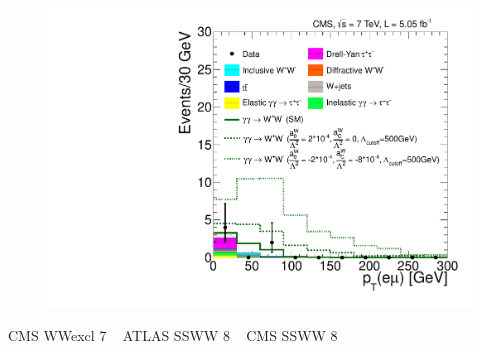 \begin{figure}[p]
    \centering
    \includegraphics[height=0.3\textheight]{figures/ss-exclboson-ww-cms7tev}
    \caption{}
    \label{fig:ss-exclboson-ww-cms7tev}
\end{figure}
CMS WWexcl 7 \TeV~\cite{Chatrchyan:2013foa}
ATLAS SSWW 8 \TeV~\cite{Aad:2014zda}
CMS SSWW 8 \TeV~\cite{Khachatryan:2014sta}
